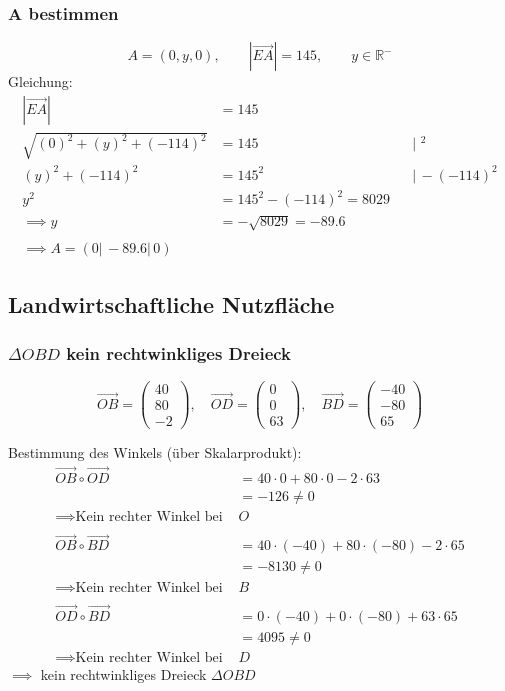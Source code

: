 \documentclass[a4paper,12pt]{article}
\newcommand{\vectr}[3]{\begin{pmatrix}#1\\#2\\#3
\end{pmatrix}}
\begin{document}
		\subsubsection{A bestimmen}
		\[A=(0,y,0),\qquad \left|\vec{EA}\right| = 145,\qquad y\in \mathds{R}^-\]
		Gleichung:
		\begin{align*}
			\left|\vec{EA}\right| &= 145&&\\
			\sqrt{(0)^2+(y)^2+(-114)^2}&= 145 &&\vert\,\,  ^2 \\
			(y)^2+(-114)^2 &= 145^2&&\vert\, - (-114)^2 \\
			y^2 &= 145^2- (-114)^2 = 8029\\
			\implies y& = -\sqrt{8029}=-89.6\\\\
			\implies A=(0|\,-89.6|\,0)
		\end{align*}
	\newpage
	\subsection{Landwirtschaftliche Nutzfläche}
	\subsubsection{$\Delta OBD$ kein rechtwinkliges Dreieck}
		\[\vec{OB}= \vectr{40}{80}{-2},\quad \vec{OD}= \vectr{0}{0}{63},\quad  \vec{BD}= \vectr{-40}{-80}{65} \]
		
		Bestimmung des Winkels (über Skalarprodukt):
		\begin{align*}
			\vec{OB} \circ \vec{OD} &= 40\cdot 0 + 80 \cdot 0 - 2 \cdot 63\\
									&=- 126\not=0\\
									\implies \text{Kein rechter Winkel bei } &O\\\\
		\vec{OB} \circ \vec{BD} &= 40\cdot (-40) + 80 \cdot (-80) - 2 \cdot 65\\
		&=-8130\not=0\\
		\implies \text{Kein rechter Winkel bei } &B\\\\
		\vec{OD} \circ \vec{BD} &= 0\cdot (-40) + 0 \cdot (-80) + 63 \cdot 65\\
		&=4095\not=0\\
		\implies \text{Kein rechter Winkel bei } &D
	\end{align*}
	$\implies$ kein rechtwinkliges Dreieck $\Delta OBD$
\end{document}
